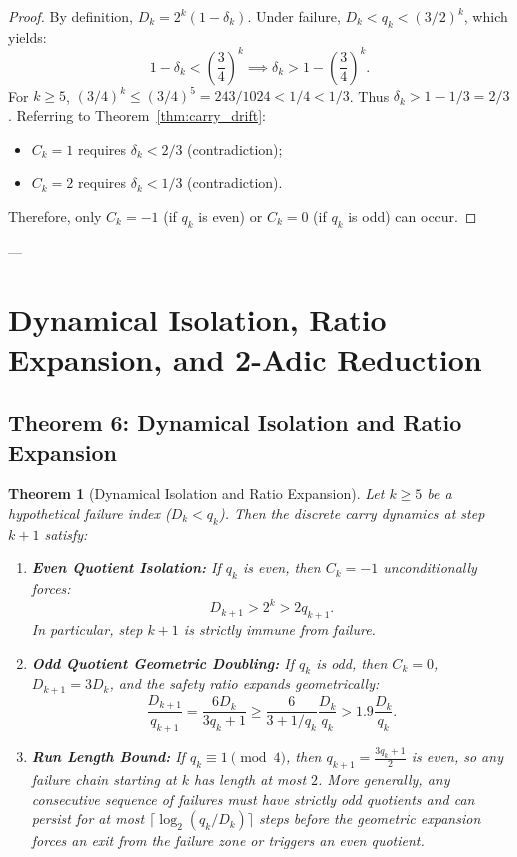 \documentclass[11pt,reqno]{amsart}
\newtheorem{theorem}{Theorem}[section]
\theoremstyle{definition}
\numberwithin{equation}{section}
\begin{document}
\begin{proof}
By definition, $D_k = 2^k(1 - \delta_k)$. Under failure, $D_k < q_k < (3/2)^k$, which yields:
\[
1 - \delta_k < \left(\frac{3}{4}\right)^k \implies \delta_k > 1 - \left(\frac{3}{4}\right)^k.
\]
For $k \ge 5$, $(3/4)^k \le (3/4)^5 = 243/1024 < 1/4 < 1/3$. Thus $\delta_k > 1 - 1/3 = 2/3$.
Referring to Theorem~\ref{thm:carry_drift}:
\begin{itemize}
    \item $C_k = 1$ requires $\delta_k < 2/3$ (contradiction);
    \item $C_k = 2$ requires $\delta_k < 1/3$ (contradiction).
\end{itemize}
Therefore, only $C_k = -1$ (if $q_k$ is even) or $C_k = 0$ (if $q_k$ is odd) can occur.
\end{proof}

---

\section{Dynamical Isolation, Ratio Expansion, and 2-Adic Reduction}

\subsection{Theorem 6: Dynamical Isolation and Ratio Expansion}\label{sec:repulsion}

\begin{theorem}[Dynamical Isolation and Ratio Expansion]\label{thm:repulsion}
Let $k \ge 5$ be a hypothetical failure index ($D_k < q_k$). Then the discrete carry dynamics at step $k+1$ satisfy:
\begin{enumerate}
    \item \textbf{Even Quotient Isolation:} If $q_k$ is even, then $C_k = -1$ unconditionally forces:
    \begin{equation}\label{eq:even_isolation}
    D_{k+1} > 2^k > 2 q_{k+1}.
    \end{equation}
    In particular, step $k+1$ is strictly immune from failure.
    \item \textbf{Odd Quotient Geometric Doubling:} If $q_k$ is odd, then $C_k = 0$, $D_{k+1} = 3 D_k$, and the safety ratio expands geometrically:
    \begin{equation}\label{eq:ratio_doubling}
    \frac{D_{k+1}}{q_{k+1}} = \frac{6 D_k}{3 q_k + 1} \ge \frac{6}{3 + 1/q_k} \frac{D_k}{q_k} > 1.9 \frac{D_k}{q_k}.
    \end{equation}
    \item \textbf{Run Length Bound:} If $q_k \equiv 1 \pmod 4$, then $q_{k+1} = \frac{3 q_k + 1}{2}$ is even, so any failure chain starting at $k$ has length at most $2$. More generally, any consecutive sequence of failures must have strictly odd quotients and can persist for at most $\lceil \log_2(q_k / D_k) \rceil$ steps before the geometric expansion forces an exit from the failure zone or triggers an even quotient.
\end{enumerate}
\end{theorem}
\end{document}
